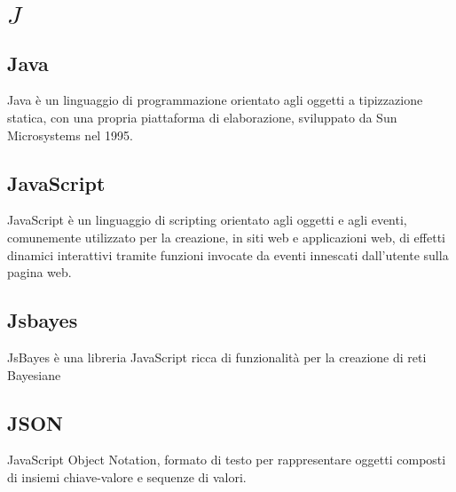 \section{\quad$J\quad$}
\subsection{Java}
Java è un linguaggio di programmazione orientato agli oggetti a tipizzazione statica, con una propria piattaforma di elaborazione, sviluppato da Sun Microsystems nel 1995.

\subsection{JavaScript}
JavaScript è un linguaggio di scripting orientato agli oggetti e agli eventi, comunemente utilizzato per la creazione, in siti web e applicazioni web, di effetti dinamici interattivi tramite funzioni invocate da eventi innescati dall’utente sulla pagina web.

\subsection{Jsbayes}
JsBayes è una libreria JavaScript ricca di funzionalità per la creazione di reti Bayesiane

\subsection{JSON}
JavaScript Object Notation, formato di testo per rappresentare oggetti composti di insiemi chiave-valore e sequenze di valori.

